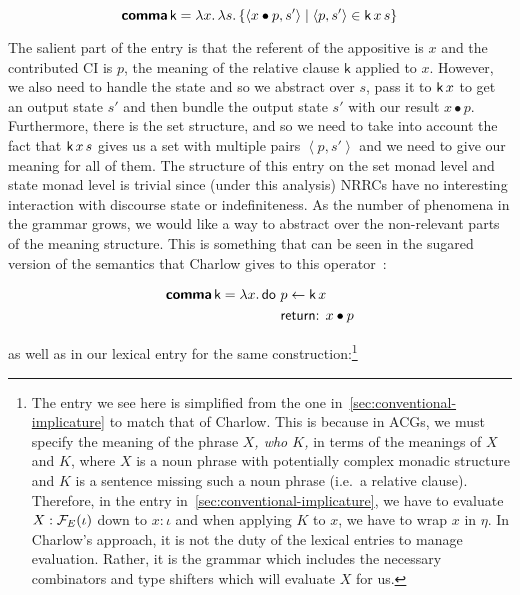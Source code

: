 \begin{itemize}
  $$
  \textsf{\textbf{comma}}\,\textsf{k} =
  \lambda x.\, \lambda s.\, \{ \left< x \bullet p, s' \right> \mid \left< p, s' \right> \in \textsf{k}\,x\,s \}
  $$

  The salient part of the entry is that the referent of the appositive is
  $x$ and the contributed CI is $p$, the meaning of the relative clause
  $\textsf{k}$ applied to $x$. However, we also need to handle the state
  and so we abstract over $s$, pass it to $\textsf{k}\,x$ to get an
  output state $s'$ and then bundle the output state $s'$ with our result
  $x \bullet p$. Furthermore, there is the set structure, and so we need to
  take into account the fact that $\textsf{k}\,x\,s$ gives us a set
  with multiple pairs $\left< p, s' \right>$ and we need to give our
  meaning for all of them. The structure of this entry on the set monad
  level and state monad level is trivial since (under this analysis) NRRCs
  have no interesting interaction with discourse state or
  indefiniteness. As the number of phenomena in the grammar grows, we would
  like a way to abstract over the non-relevant parts of the meaning
  structure. This is something that can be seen in the sugared version of
  the semantics that Charlow gives to this
  operator~\cite{degroote2015conservativity}:

  $$
  \textsf{\textbf{comma}}\,\textsf{k} = \lambda x.\, \textsf{do }
    \begin{aligned}[t]
      & p \leftarrow \textsf{k}\,x \\
      & \textsf{return: } x \bullet p
    \end{aligned}
  $$

  as well as in our lexical entry for the same construction:\footnote{The
    entry we see here is simplified from the one
    in~\ref{sec:conventional-implicature} to match that of Charlow. This is
    because in ACGs, we must specify the meaning of the phrase \emph{$X$,
      who $K$,} in terms of the meanings of $X$ and $K$, where $X$ is a
    noun phrase with potentially complex monadic structure and $K$ is a
    sentence missing such a noun phrase (i.e.\ a relative
    clause). Therefore, in the entry in~\ref{sec:conventional-implicature},
    we have to evaluate $X : \mathcal{F}_E(\iota)$ down to $x : \iota$ and when
    applying $K$ to $x$, we have to wrap $x$ in $\eta$. In Charlow's
    approach, it is not the duty of the lexical entries to manage
    evaluation. Rather, it is the grammar which includes the necessary
    combinators and type shifters which will evaluate $X$ for us.}


\end{itemize}
